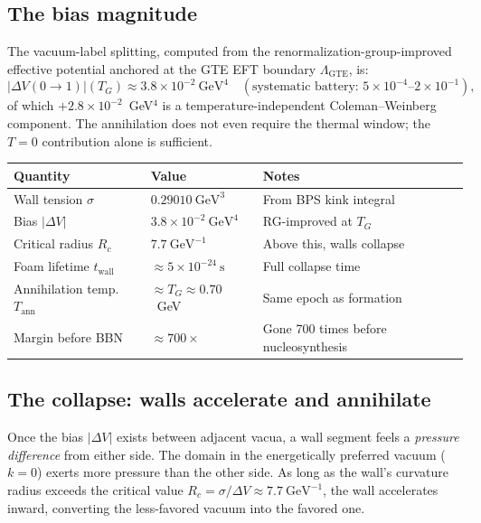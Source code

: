 \documentclass[11pt,a4paper]{article}
\begin{document}
\subsection{The bias magnitude}

The vacuum-label splitting, computed from the
renormalization-group-improved effective potential anchored at the GTE
EFT boundary $\Lambda_\mathrm{GTE}$, is:
\begin{equation}
  |\Delta V(0\to 1)|(T_G) \approx 3.8 \times 10^{-2}~\text{GeV}^4
  \quad (\text{systematic battery: } 5\times10^{-4}\text{--}2\times10^{-1}),
  \label{eq:bias}
\end{equation}
of which $+2.8\times10^{-2}$~GeV$^4$ is a temperature-independent
Coleman--Weinberg component.
The annihilation does not even require the thermal window; the $T=0$
contribution alone is sufficient.

\begin{tcolorbox}[colback=boxorange,colframe=orange!60!black,title=Key numbers]
\begin{center}
\renewcommand{\arraystretch}{1.3}
\begin{tabular}{lll}
\toprule
Quantity & Value & Notes \\
\midrule
Wall tension $\sigma$ & $0.29010~\text{GeV}^3$ & From BPS kink integral \\
Bias $|\Delta V|$ & $3.8\times10^{-2}~\text{GeV}^4$ & RG-improved at $T_G$ \\
Critical radius $R_c$ & $7.7~\text{GeV}^{-1}$ & Above this, walls collapse \\
Foam lifetime $t_\mathrm{wall}$ & $\approx 5\times10^{-24}~\text{s}$ & Full collapse time \\
Annihilation temp.\ $T_\mathrm{ann}$ & $\approx T_G \approx 0.70$~GeV & Same epoch as formation \\
Margin before BBN & $\approx 700\times$ & Gone 700 times before nucleosynthesis \\
\bottomrule
\end{tabular}
\end{center}
\end{tcolorbox}

\subsection{The collapse: walls accelerate and annihilate}

Once the bias $|\Delta V|$ exists between adjacent vacua, a wall segment
feels a \emph{pressure difference} from either side.
The domain in the energetically preferred vacuum ($k = 0$) exerts more
pressure than the other side.
As long as the wall's curvature radius exceeds the critical value
$R_c = \sigma/\Delta V \approx 7.7~\text{GeV}^{-1}$, the wall accelerates
inward, converting the less-favored vacuum into the favored one.
\end{document}
